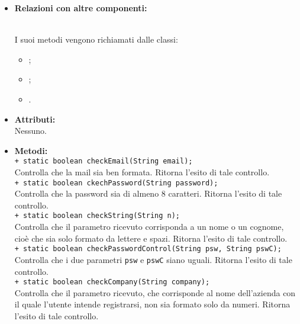 {{\begin{sloppypar}
{{\begin{itemize}
				\item[] \textbf{Relazioni con altre componenti:}{\\
				I suoi metodi vengono richiamati dalle classi:
				\begin{itemize}
					\item[] ;
					\item[] ;
					\item[] .\\
				\end{itemize}
				}
				
				\item[] \textbf{Attributi:}{\\
				Nessuno.\\
				}
			
				\item[] \textbf{Metodi:}{ \\
					\texttt{+ static boolean checkEmail(String email);}\\
					Controlla che la mail sia ben formata. Ritorna l'esito di tale controllo.\\
					
					\texttt{+ static boolean ckechPassword(String password);}\\
					Controlla che la password sia di almeno 8 caratteri. Ritorna l'esito di tale controllo.\\
					
					\texttt{+ static boolean checkString(String n);}\\
					Controlla che il parametro ricevuto corrisponda a un nome o un cognome, cioè che sia solo formato da lettere e spazi. Ritorna l'esito di tale controllo.\\
					
					\texttt{+ static boolean checkPasswordControl(String psw, String pswC);}\\
					Controlla che i due parametri \texttt{psw} e \texttt{pswC} siano uguali. Ritorna l'esito di tale controllo.\\
					
					\texttt{+ static boolean checkCompany(String company);}\\
					Controlla che il parametro ricevuto, che corrisponde al nome dell'azienda con il quale l'utente intende registrarsi, non sia formato solo da numeri. Ritorna l'esito di tale controllo.\\
					
}
\end{itemize}}}
\end{sloppypar}}}
